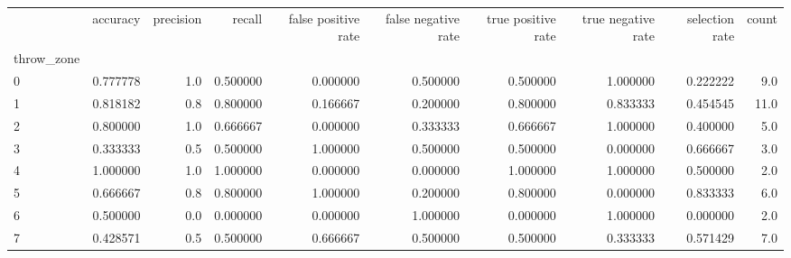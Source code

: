 \begin{tabular}{lrrrrrrrrr}
\toprule
{} &  accuracy &  precision &    recall &  false positive rate &  false negative rate &  true positive rate &  true negative rate &  selection rate &  count \\
throw\_zone &           &            &           &                      &                      &                     &                     &                 &        \\
\midrule
0          &  0.777778 &        1.0 &  0.500000 &             0.000000 &             0.500000 &            0.500000 &            1.000000 &        0.222222 &    9.0 \\
1          &  0.818182 &        0.8 &  0.800000 &             0.166667 &             0.200000 &            0.800000 &            0.833333 &        0.454545 &   11.0 \\
2          &  0.800000 &        1.0 &  0.666667 &             0.000000 &             0.333333 &            0.666667 &            1.000000 &        0.400000 &    5.0 \\
3          &  0.333333 &        0.5 &  0.500000 &             1.000000 &             0.500000 &            0.500000 &            0.000000 &        0.666667 &    3.0 \\
4          &  1.000000 &        1.0 &  1.000000 &             0.000000 &             0.000000 &            1.000000 &            1.000000 &        0.500000 &    2.0 \\
5          &  0.666667 &        0.8 &  0.800000 &             1.000000 &             0.200000 &            0.800000 &            0.000000 &        0.833333 &    6.0 \\
6          &  0.500000 &        0.0 &  0.000000 &             0.000000 &             1.000000 &            0.000000 &            1.000000 &        0.000000 &    2.0 \\
7          &  0.428571 &        0.5 &  0.500000 &             0.666667 &             0.500000 &            0.500000 &            0.333333 &        0.571429 &    7.0 \\
\bottomrule
\end{tabular}
